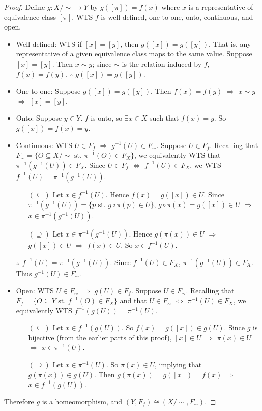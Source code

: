 \documentclass[12pt]{amsart}
\begin{document}
\begin{proof} Define $g \colon X/\sim \rightarrow Y$ by $g([\pi]) = f(x)$ where $x$ is a representative of equivalence class $[\pi]$. WTS $f$ is well-defined, one-to-one, onto, continuous, and open.

\begin{itemize}
	\item Well-defined: WTS if $[x]=[y]$, then $g([x])=g([y])$. That is, any representative of a given equivalence class maps to the same value. Suppose $[x]=[y]$. Then $x \sim y$; since $\sim$ is the relation induced by $f$, $f(x)=f(y)$. $\therefore$ $g([x])=g([y])$.
	\item One-to-one: Suppose $g([x])=g([y])$. Then $f(x)=f(y)$ $\Rightarrow$ $x \sim y$ $\Rightarrow$ $[x]=[y]$.
	\item Onto: Suppose $y \in Y$. $f$ is onto, so $\exists x \in X$ such that $f(x)=y$. So $g([x]) = f(x) = y$.
	\item Continuous: WTS $U \in F_f$ $\Rightarrow$ $g^{-1}(U) \in F_\sim$. Suppose $U \in F_f$. Recalling that $F_\sim = \{ O \subseteq X/\sim \text{ st. } \pi^{-1}(O) \in F_X \}$, we equivalently WTS that $\pi^{-1}(g^{-1}(U)) \in F_X$. Since $U \in F_f$ $\Leftrightarrow$ $f^{-1}(U) \in F_X$, we WTS $f^{-1}(U) = \pi^{-1}(g^{-1}(U))$.
		\begin{itemize}
			\item[$(\subseteq)$] Let $x \in f^{-1}(U)$. Hence $f(x) = g([x]) \in U$. Since $\pi^{-1}(g^{-1}(U)) = \{ p \text{ st. } g \circ \pi (p) \in U \}$, $g \circ \pi (x) = g([x]) \in U$ $\Rightarrow$ $x \in \pi^{-1}(g^{-1}(U))$.
			\item[$(\supseteq)$] Let $x \in \pi^{-1}(g^{-1}(U))$. Hence $g(\pi(x)) \in U$ $\Rightarrow$ $g([x]) \in U$ $\Rightarrow$ $f(x) \in U$. So $x \in f^{-1}(U)$.
		\end{itemize}
$\therefore$ $f^{-1}(U) = \pi^{-1}(g^{-1}(U))$. Since $f^{-1}(U) \in F_X$, $\pi^{-1}(g^{-1}(U)) \in F_X$. Thus $g^{-1}(U) \in F_\sim$.
	\item Open: WTS $U \in F_\sim$ $\Rightarrow$ $g(U) \in F_f$. Suppose $U \in F_\sim$. Recalling that $F_f = \{ O \subseteq Y \text{ st. } f^{-1}(O) \in F_X \}$ and that $U \in F_\sim$ $\Leftrightarrow$ $\pi^{-1}(U) \in F_X$, we equivalently WTS $f^{-1}(g(U)) = \pi^{-1}(U)$.
		\begin{itemize}
			\item[$(\subseteq)$] Let $x \in f^{-1}(g(U))$. So $f(x)=g([x]) \in g(U)$. Since $g$ is bijective (from the earlier parts of this proof), $[x] \in U$ $\Rightarrow$ $\pi(x) \in U$ $\Rightarrow$ $x \in \pi^{-1}(U)$.
			\item[$(\supseteq)$] Let $x \in \pi^{-1}(U)$. So $\pi(x) \in U$, implying that $g(\pi(x)) \in g(U)$. Then $g(\pi(x)) = g([x]) = f(x)$ $\Rightarrow$ $x \in f^{-1}(g(U))$.
		\end{itemize}
\end{itemize}
Therefore $g$ is a homeomorphism, and $(Y,F_f) \cong (X/\sim,F_\sim)$.
\end{proof}
\end{document}
